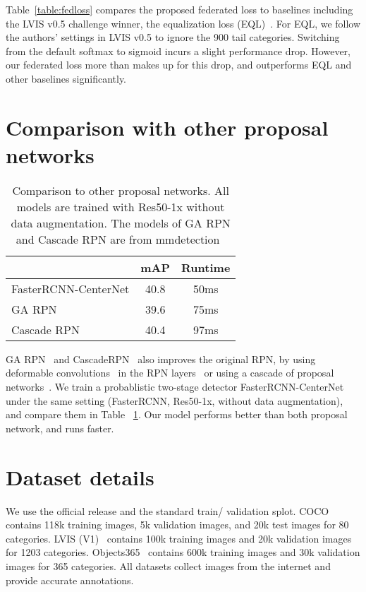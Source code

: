 \documentclass{article}
\begin{document}
Table~\ref{table:fedloss} compares the proposed federated loss to baselines including the LVIS v0.5 challenge winner, the equalization loss (EQL)~\cite{tan2020eql}.
For EQL, we follow the authors' settings in LVIS v0.5 to ignore the 900 tail categories.
Switching from the default softmax to sigmoid incurs a slight performance drop.
However, our federated loss more than makes up for this drop, and outperforms EQL and other baselines significantly.

\section{Comparison with other proposal networks}

\begin{table}[t]
\centering
\begin{tabular}{l@{\ \ \ \ }c@{\ \ \ \ }c}
\toprule
 & mAP & Runtime\\
\midrule
FasterRCNN-CenterNet & 40.8 & 50ms\\
GA RPN~\cite{wang2019region} & 39.6 & 75ms \\
Cascade RPN~\cite{vu2019cascade} & 40.4 & 97ms \\
\bottomrule
\end{tabular}
\vspace{-2mm}
\caption{Comparison to other proposal networks. All models are trained with Res50-1x without data augmentation. The models of GA RPN and Cascade RPN are from mmdetection~\cite{mmdetection}}
\label{table:otherrpn}
\vspace{-5mm}
\end{table}

GA RPN~\cite{wang2019region} and CascadeRPN~\cite{vu2019cascade} also improves the original RPN, by using deformable convolutions~\cite{zhu2018deformable} in the RPN layers~\cite{wang2019region} or using a cascade of proposal networks~\cite{vu2019cascade}.
We train a probablistic two-stage detector FasterRCNN-CenterNet under the same setting (FasterRCNN, Res50-1x, without data augmentation), 
and compare them in Table ~\ref{table:otherrpn}.
Our model performs better than both proposal network, and runs faster.

{
\section{Dataset details}
We use the official release and the standard train/ validation splot.
COCO~\cite{lin2014coco} contains 118k training images, 5k validation images, and 20k test images for 80 categories.
LVIS (V1)~\cite{gupta2019lvis} contains 100k training images and 20k validation images for 1203 categories. 
Objects365~\cite{shao2019objects365} contains 600k training images and 30k validation images for 365 categories.
All datasets collect images from the internet and provide accurate annotations.
}
\end{document}
